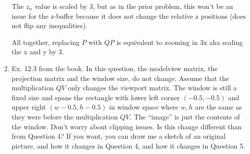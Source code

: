 \documentclass[letterpaper, 11pt]{article}
\begin{document}
\begin{enumerate}
{\begin{minipage}{6in}
    The $z_n$ value is scaled by 3, but as in the prior problem, this won't be an issue for the z-buffer because it does not change the relative z positions (does not flip any inequalities).

    All together, replacing $P$ with $QP$ is equivalent to zooming in 3x aka scaling the x and y by 3.
\end{minipage}
}

\item Ex. 12.3 from the book.
In this  question, the modelview matrix, the projection matrix and
the window size, do not change.
Assume that the multiplication $QV$
  only changes the viewport matrix. The window is still a fixed size
  and spans the rectangle with lower left corner $(-0.5, -0.5)$ and
  upper right $(w-0.5, h-0.5)$ in window space where $w, h$ are the
  same as they were before the multiplication $QV$. The ``image'' is
  just the contents of the window.  Don't worry about clipping issues.
  Is this change different than from Question 4?  If you want, you
  can draw me a sketch of an original picture, and how it changes in
  Question 4, and how it changes in Question 5.

\end{enumerate}
\end{document}
